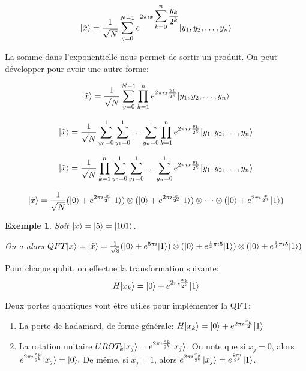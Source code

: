 \documentclass[12pt,a4paper]{article}
\DeclarePairedDelimiter\ket{\lvert}{\rangle}
\newtheorem{ex}{Exemple}
\begin{document}
\[ \ket{\tilde{x}} = \frac{1}{\sqrt{N}} \displaystyle\sum_{y=0}^{N-1} e^{2 \pi \imath x \displaystyle\sum_{k=0}^{n} \frac{y_k}{2^k}} \ket{y_1 , y_2 , \dots , y_n}  \]

La somme dans l'exponentielle nous permet de sortir un produit. On peut développer pour avoir une autre forme:

\[ \ket{\tilde{x}} = \frac{1}{\sqrt{N}} \displaystyle\sum_{y=0}^{N-1}  \displaystyle\prod_{k=1}^{n}  e^{2 \pi \imath x \frac{y_k}{2^k}} \ket{y_1 , y_2 , \dots , y_n}   \]

\[ \ket{\tilde{x}} = \frac{1}{\sqrt{N}} \displaystyle\sum_{y_0 = 0}^{1} \displaystyle\sum_{y_1 =0}^{1} \dots \displaystyle\sum_{y_n =0}^{1} \displaystyle\prod_{k=1}^{n}  e^{2 \pi \imath x \frac{y_k}{2^k}} \ket{y_1 , y_2 , \dots , y_n}   \]

\[ \ket{\tilde{x}} = \frac{1}{\sqrt{N}} \displaystyle\prod_{k=1}^{n} \displaystyle\sum_{y_0 = 0}^{1} \displaystyle\sum_{y_1 =0}^{1} \dots \displaystyle\sum_{y_n =0}^{1} e^{2 \pi \imath x \frac{y_k}{2^k}} \ket{y_1 , y_2 , \dots , y_n}   \]

\[ \ket{\tilde{x}} = \frac{1}{\sqrt{N}} (\ket{0} + e^{2 \pi \imath \frac{x}{2^1}}\ket{1}) \otimes  (\ket{0} + e^{2 \pi \imath \frac{x}{2^2}}\ket{1}) \otimes \dots \otimes (\ket{0} + e^{2 \pi \imath \frac{x}{2^n}}\ket{1}) \]

\begin{ex} 
  
  Soit $\ket{x} = \ket{5} = \ket{101}$. 
  
  On a alors $QFT\ket{x} = \ket{\tilde{x}} = \frac{1}{\sqrt{8}} (\ket{0} + e^{5 \pi \imath}\ket{1}) \otimes (\ket{0} + e^{ \frac{1}{2} \pi \imath 5 }\ket{1}) \otimes (\ket{0} + e^{\frac{1}{4} \pi \imath 5}\ket{1})$
\end{ex}




Pour chaque qubit, on effectue la transformation suivante: 
\[ H\ket{x_k} = \ket{0} + e^{2 \pi \imath \frac{x_k}{2^k}}\ket{1} \]

Deux portes quantiques vont être utiles pour implémenter la QFT:
\begin{enumerate}
  \item La porte de hadamard, de forme générale: $H\ket{x_k} = \ket{0} + e^{2 \pi \imath \frac{x_k}{2}} \ket{1}$
  \item La rotation unitaire $UROT_k\ket{x_j} = e^{2 \pi \imath \frac{x_k}{2^k}} \ket{x_j}$. On note que si $x_j = 0$, alors $e^{2 \pi \imath \frac{x_k}{2^k}} \ket{x_j} = \ket{0}.$ De même, si $x_j = 1$, alors $e^{2 \pi \imath \frac{x_k}{2^k}} \ket{x_j} = e^{\frac{2 \pi \imath}{2^k}} \ket{1}$.
\end{enumerate}
\end{document}
